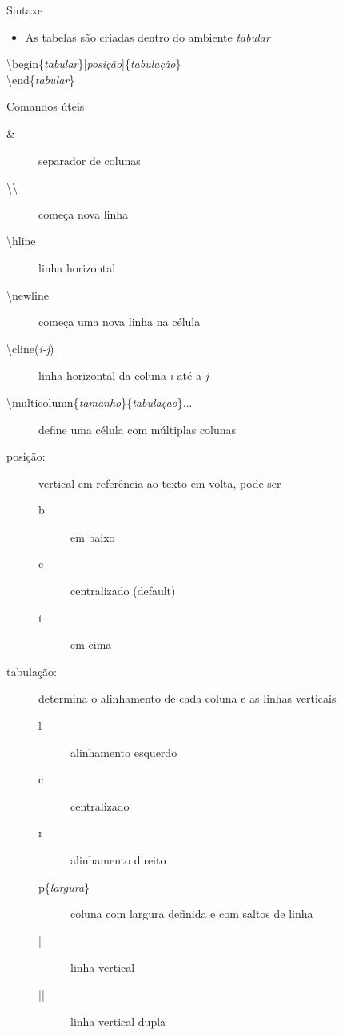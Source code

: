 \documentclass{beamer}
\begin{document}
\begin{frame}[allowframebreaks]{Sintaxe}
    \begin{itemize}
    \item As tabelas são criadas dentro do ambiente \textit{tabular}
    \end{itemize}

    \alert{\textbackslash begin\{\textit{tabular}\}[\textit{posição}]\{\textit{tabulação}\} \\
           \textbackslash end\{\textit{tabular}\}
          }

    \begin{block}{Comandos úteis}
        \begin{description}
        \item[\&] separador de colunas
        \item[\textbackslash\textbackslash] começa nova linha
        \item[\textbackslash hline] linha horizontal
        \item[\textbackslash newline] começa uma nova linha na célula
        \item[\textbackslash cline(\textit{i-j})] linha horizontal da coluna \textit{i} até a \textit{j}
        \item[\textbackslash multicolumn\{\textit{tamanho}\}\{\textit{tabulaçao}\}{...}] define uma célula com múltiplas colunas
        \end{description}
    \end{block}

    \newpage
    
    \begin{description}
    \item[posição:] vertical em referência ao texto em volta, pode ser
        \begin{description}
        \item[b] em baixo
        \item[c] centralizado (default)
        \item[t] em cima
        \end{description}
    \item[tabulação:] determina o alinhamento de cada coluna e as linhas verticais
        \begin{description}
        \item[l] alinhamento esquerdo
        \item[c] centralizado
        \item[r] alinhamento direito
        \item[p\{\textit{largura}\}] coluna com largura definida e com saltos de linha
        \item[|] linha vertical
        \item[||] linha vertical dupla
        \end{description}
    \end{description}
\end{frame}
\end{document}
